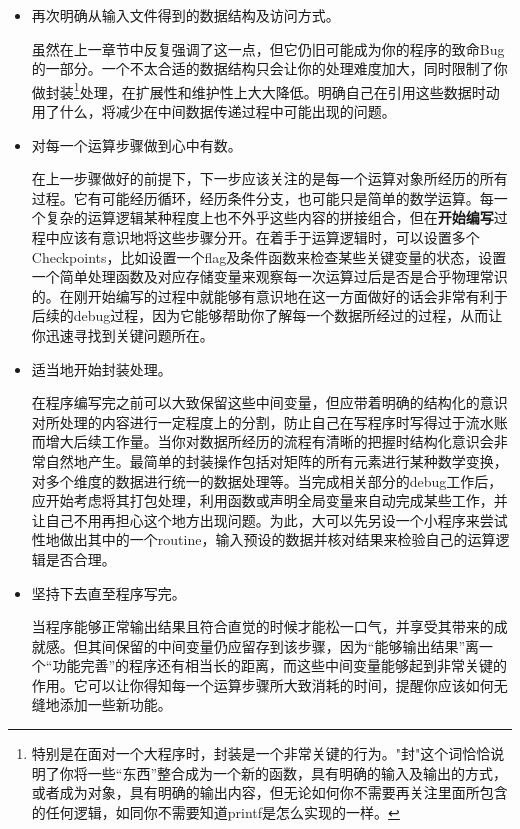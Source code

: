 \documentclass[12pt,a4paper]{article}
\begin{document}
\begin{itemize}
	\item 再次明确从输入文件得到的数据结构及访问方式。

	虽然在上一章节中反复强调了这一点，但它仍旧可能成为你的程序的致命Bug的一部分。一个不太合适的数据结构只会让你的处理难度加大，同时限制了你做封装\footnote{特别是在面对一个大程序时，封装是一个非常关键的行为。"封"这个词恰恰说明了你将一些``东西''整合成为一个新的函数，具有明确的输入及输出的方式，或者成为对象，具有明确的输出内容，但无论如何你不需要再关注里面所包含的任何逻辑，如同你不需要知道printf是怎么实现的一样。}处理，在扩展性和维护性上大大降低。明确自己在引用这些数据时动用了什么，将减少在中间数据传递过程中可能出现的问题。

	\item 对每一个运算步骤做到心中有数。

	在上一步骤做好的前提下，下一步应该关注的是每一个运算对象所经历的所有过程。它有可能经历循环，经历条件分支，也可能只是简单的数学运算。每一个复杂的运算逻辑某种程度上也不外乎这些内容的拼接组合，但在\textbf{开始编写}过程中应该有意识地将这些步骤分开。在着手于运算逻辑时，可以设置多个Checkpoints，比如设置一个flag及条件函数来检查某些关键变量的状态，设置一个简单处理函数及对应存储变量来观察每一次运算过后是否是合乎物理常识的。在刚开始编写的过程中就能够有意识地在这一方面做好的话会非常有利于后续的debug过程，因为它能够帮助你了解每一个数据所经过的过程，从而让你迅速寻找到关键问题所在。

	\item 适当地开始封装处理。

	在程序编写完之前可以大致保留这些中间变量，但应带着明确的结构化的意识对所处理的内容进行一定程度上的分割，防止自己在写程序时写得过于流水账而增大后续工作量。当你对数据所经历的流程有清晰的把握时结构化意识会非常自然地产生。最简单的封装操作包括对矩阵的所有元素进行某种数学变换，对多个维度的数据进行统一的数据处理等。当完成相关部分的debug工作后，应开始考虑将其打包处理，利用函数或声明全局变量来自动完成某些工作，并让自己不用再担心这个地方出现问题。为此，大可以先另设一个小程序来尝试性地做出其中的一个routine，输入预设的数据并核对结果来检验自己的运算逻辑是否合理。

	\item 坚持下去直至程序写完。

	当程序能够正常输出结果且符合直觉的时候才能松一口气，并享受其带来的成就感。但其间保留的中间变量仍应留存到该步骤，因为``能够输出结果''离一个``功能完善''的程序还有相当长的距离，而这些中间变量能够起到非常关键的作用。它可以让你得知每一个运算步骤所大致消耗的时间，提醒你应该如何无缝地添加一些新功能。


\end{itemize}
\end{document}
